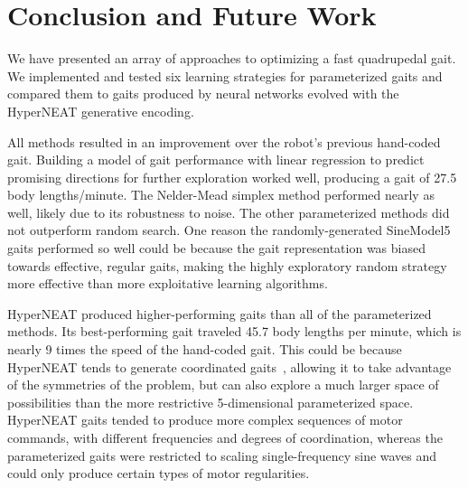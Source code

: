 \section{Conclusion and Future Work}

We have presented an array of approaches to optimizing a fast quadrupedal
gait.  We implemented and tested six learning
strategies for parameterized gaits and compared them to gaits produced by neural networks
evolved with the HyperNEAT generative encoding.

All methods resulted in an improvement over the robot's previous
hand-coded gait.  Building a model of gait
performance with linear regression to predict promising directions for further exploration
worked well, producing a gait of 27.5 body
lengths/minute.  The Nelder-Mead simplex method performed nearly as well, likely due to its robustness to noise.  The other parameterized
methods did not outperform random search.  One reason the randomly-generated SineModel5 gaits performed so well could be because the gait representation was biased towards effective, regular gaits, making the highly exploratory random strategy more effective than more exploitative learning algorithms. 

HyperNEAT produced higher-performing gaits than all of the parameterized
methods. Its best-performing gait traveled 45.7 body lengths per minute, which is nearly 9 times the speed of the hand-coded gait.  This could be because HyperNEAT tends to generate coordinated gaits~\citep{clune2011performance, clune2009evolving}, allowing it to
take advantage of the symmetries of the problem, but can also explore a much larger space of possibilities than the
more restrictive 5-dimensional parameterized space.  HyperNEAT gaits tended to produce more complex sequences of motor commands, with different frequencies and degrees of coordination, whereas the
parameterized gaits were restricted to scaling single-frequency sine waves and could only produce certain types of motor regularities. 
